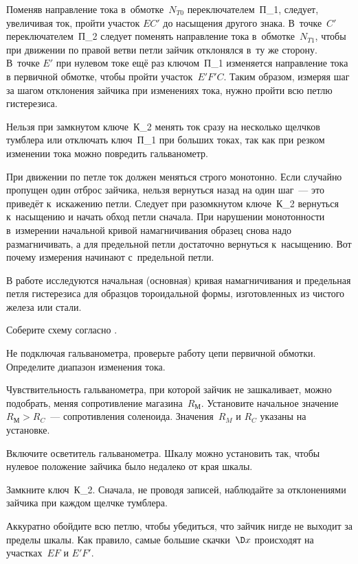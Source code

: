 Поменяв направление тока в~обмотке~$N_{T0}$ переключателем~П\_1, следует, увеличивая ток, пройти участок $EC'$ до
насыщения другого знака. В~точке~$C'$ переключателем~П\_2 следует поменять направление тока в~обмотке~$N_{T1}$, чтобы при
движении по правой ветви петли зайчик отклонялся в~ту же сторону. В~точке $E'$ при нулевом токе ещё раз ключом~П\_1
изменяется направление тока в первичной обмотке, чтобы пройти участок~$E'F'C$. Таким образом, измеряя шаг за шагом
отклонения зайчика при изменениях тока, нужно пройти всю петлю гистерезиса.

Нельзя при замкнутом ключе~К\_2 менять ток сразу на несколько щелчков тумблера или отключать ключ~П\_1 при больших
токах, так как при резком изменении тока можно повредить гальванометр.

При движении по петле ток должен меняться строго монотонно. Если случайно пропущен один отброс зайчика, нельзя вернуться
назад на один шаг~--- это приведёт к~искажению петли. Следует при разомкнутом ключе~К\_2 вернуться к~насыщению и начать
обход петли сначала. При нарушении монотонности в~измерении начальной кривой намагничивания образец снова надо
размагничивать, а для предельной петли достаточно вернуться к~насыщению. Вот почему измерения начинают с~предельной
петли.

\zad

В работе исследуются начальная (основная) кривая намагничивания и предельная петля гистерезиса для образцов тороидальной
формы, изготовленных из чистого железа или стали.

\dopop

\n Соберите схему согласно .

\n Не подключая гальванометра, проверьте работу цепи первичной обмотки. Определите диапазон изменения тока.

\n Чувствительность гальванометра, при которой зайчик не зашкаливает, можно подобрать, меняя сопротивление
магазина~$R_М$. Установите начальное значение~$R_М>R_C$~--- сопротивления соленоида. Значения~$R_M$ и $R_C$ указаны на
установке.

Включите осветитель гальванометра. Шкалу можно установить так, чтобы нулевое положение зайчика было недалеко от края
шкалы.


\n Замкните ключ~К\_2. Сначала, не проводя записей, наблюдайте за отклонениями зайчика при каждом щелчке тумблера.

Аккуратно обойдите всю петлю, чтобы убедиться, что зайчик нигде не выходит за пределы шкалы. Как правило, самые большие
скачки~$\D x$ происходят на участках~$EF$ и $E'F'$.

